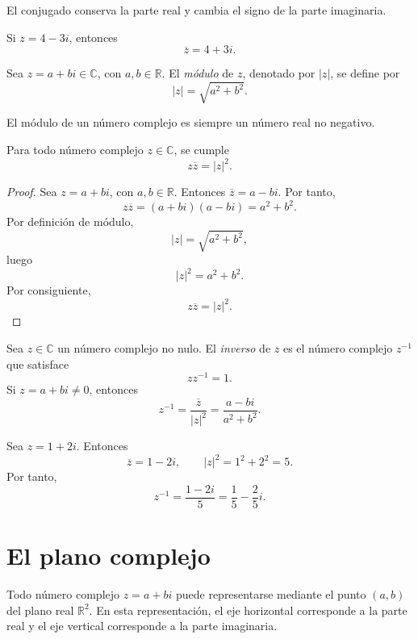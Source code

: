 El conjugado conserva la parte real y cambia el signo de la parte imaginaria.

\begin{ejemplo}
Si \(z=4-3i\), entonces
\[
  \overline{z}=4+3i.
\]
\end{ejemplo}

\begin{definicion}[Módulo]
Sea \(z=a+bi\in\mathbb{C}\), con \(a,b\in\mathbb{R}\). El \emph{módulo} de \(z\), denotado por \(|z|\), se define por
\[
  |z|=\sqrt{a^2+b^2}.
\]
\end{definicion}

El módulo de un número complejo es siempre un número real no negativo.

\begin{proposicion}
Para todo número complejo \(z\in\mathbb{C}\), se cumple
\[
  z\overline{z}=|z|^2.
\]
\end{proposicion}

\begin{proof}
Sea \(z=a+bi\), con \(a,b\in\mathbb{R}\). Entonces \(\overline{z}=a-bi\). Por tanto,
\[
  z\overline{z}=(a+bi)(a-bi)=a^2+b^2.
\]
Por definición de módulo,
\[
  |z|=\sqrt{a^2+b^2},
\]
luego
\[
  |z|^2=a^2+b^2.
\]
Por consiguiente,
\[
  z\overline{z}=|z|^2.
\]
\end{proof}

\begin{definicion}[Inverso]
Sea \(z\in\mathbb{C}\) un número complejo no nulo. El \emph{inverso} de \(z\) es el número complejo \(z^{-1}\) que satisface
\[
  zz^{-1}=1.
\]
Si \(z=a+bi\neq 0\), entonces
\[
  z^{-1}=\frac{\overline{z}}{|z|^2}
  =\frac{a-bi}{a^2+b^2}.
\]
\end{definicion}

\begin{ejemplo}
Sea \(z=1+2i\). Entonces
\[
  \overline{z}=1-2i,
  \qquad
  |z|^2=1^2+2^2=5.
\]
Por tanto,
\[
  z^{-1}=\frac{1-2i}{5}=\frac{1}{5}-\frac{2}{5}i.
\]
\end{ejemplo}

\section{El plano complejo}

Todo número complejo \(z=a+bi\) puede representarse mediante el punto \((a,b)\) del plano real \(\mathbb{R}^2\). En esta representación, el eje horizontal corresponde a la parte real y el eje vertical corresponde a la parte imaginaria.

